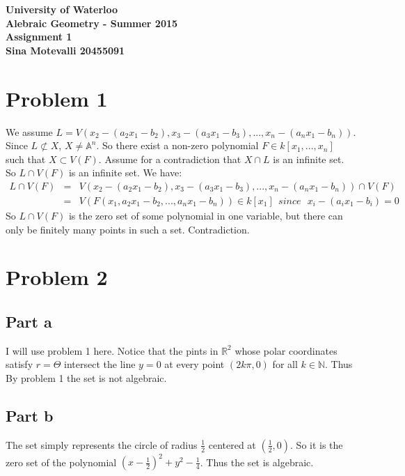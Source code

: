 \documentclass[12pt]{article}
\begin{document}
\begin{center}
  {\Large\bf University of Waterloo}\\
  \vspace{3mm}
         {\Large\bf Alebraic Geometry - Summer 2015}\\
         \vspace{2mm}
                {\Large\bf Assignment 1}\\
                \vspace{3mm}
                \textbf{Sina Motevalli 20455091}
\end{center}
\section*{Problem 1}
We assume $L=V(x_2-(a_2x_1-b_2),x_3-(a_3x_1-b_3),...,x_n-(a_nx_1-b_n))$.
Since $L \not\subset X$, $X \not= \mathbb{A}^n$. So there exist a non-zero polynomial $F \in k[x_1,...,x_n]$ such that $X \subset V(F)$. Assume for a contradiction that $X \cap L$ is an infinite set. So $L \cap V(F)$ is an infinite set. We have:
\begin{eqnarray*}
L \cap V(F) &=&
V(x_2-(a_2x_1-b_2),x_3-(a_3x_1-b_3),...,x_n-(a_nx_1-b_n)) \cap V(F)
\\ &=&
V(F(x_1,a_2x_1-b_2,...,a_nx_1-b_n)) \in k[x_1]  \ \ since \ \ \ x_i-(a_ix_1-b_i)=0
\end{eqnarray*}  
So $L \cap V(F)$ is the zero set of some polynomial in one variable, but there can only be finitely many points in such a set. Contradiction.

\clearpage
\section*{Problem 2}
\subsection*{Part a}
I will use problem 1 here. Notice that the pints in $\mathbb{R}^2$ whose polar coordinates satisfy $r=\Theta$ intersect the line $y=0$ at every point $(2k\pi, 0)$ for all $k \in \mathbb{N}$. Thus By problem 1 the set is not algebraic.
\subsection*{Part b}
The set simply represents the circle of radius $\frac{1}{2}$ centered at $(\frac{1}{2},0)$. So it is the zero set of the polynomial $(x-\frac{1}{2})^2+y^2-\frac{1}{4}$. Thus the set is algebraic.
\end{document}
